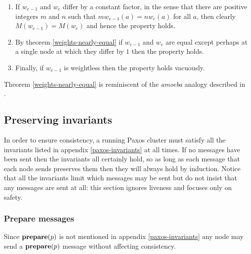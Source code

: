 \documentclass[journal]{IEEEtran}
\begin{document}
\begin{enumerate}

\item If $w_{e-1}$ and $w_e$ differ by a constant factor, in the sense that
there are positive integers $m$ and $n$ such that $m w_{e-1}(a) = n w_e(a)$ for
all $a$, then clearly ${M(w_{e-1}) = M(w_e)}$ and hence the property holds.

\item By theorem \ref{weights-nearly-equal} if $w_{e-1}$ and $w_e$ are equal
except perhaps at a single node at which they differ by $1$ then the property
holds.

\item Finally, if $w_{e-1}$ is weightless then the property holds vacuously.

\end{enumerate}

Theorem \ref{weights-nearly-equal} is reminiscent of the \textit{amoeba}
analogy described in \cite{cheap-paxos}.

\subsection{Preserving invariants}

In order to ensure consistency, a running Paxos cluster must satisfy all the
invariants listed in appendix \ref{paxos-invariants} at all times. If no
messages have been sent then the invariants all certainly hold, so as long as
each message that each node sends preserves them then they will always hold by
induction. Notice that all the invariants limit which messages may be sent but
do not insist that any messages are sent at all: this section ignores liveness
and focuses only on safety.

\subsubsection{Prepare messages} Since $\mathbf{prepare}(p)$ is not mentioned in appendix
\ref{paxos-invariants} any node may send a $\mathbf{prepare}(p)$ message without affecting
consistency.
\end{document}
